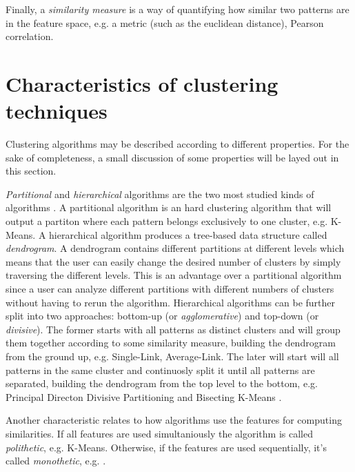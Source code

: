 Finally, a \emph{similarity measure} is a way of quantifying how similar two patterns are in the feature space, e.g. a metric (such as the euclidean distance), Pearson correlation.%

\section{Characteristics of clustering techniques}

Clustering algorithms may be described according to different properties.
For the sake of completeness, a small discussion of some properties will be layed out in this section.

\emph{Partitional} and \emph{hierarchical} algorithms are the two most studied kinds of algorithms \cite{Aggarwal2014}.
A partitional algorithm is an hard clustering algorithm that will output a partiton where each pattern belongs exclusively to one cluster, e.g. K-Means.
A hierarchical algorithm produces a tree-based data structure called \emph{dendrogram}.
A dendrogram contains different partitions at different levels which means that the user can easily change the desired number of clusters by simply traversing the different levels.
This is an advantage over a partitional algorithm since a user can analyze different partitions with different numbers of clusters without having to rerun the algorithm.
Hierarchical algorithms can be further split into two approaches: bottom-up (or \emph{agglomerative}) and top-down (or \emph{divisive}).
The former starts with all patterns as distinct clusters and will group them together according to some similarity measure, building the dendrogram from the ground up, e.g. Single-Link, Average-Link.
The later will start will all patterns in the same cluster and continuosly split it until all patterns are separated, building the dendrogram from the top level to the bottom, e.g. Principal Directon Divisive Partitioning\cite{Boley1998} and Bisecting K-Means \cite{Steinbach2000}.


Another characteristic relates to how algorithms use the features for computing similarities.
If all features are used simultaniously the algorithm is called \emph{polithetic}, e.g. K-Means.
Otherwise, if the features are used sequentially, it's called \emph{monothetic}, e.g. \cite{Chavent1998}.

